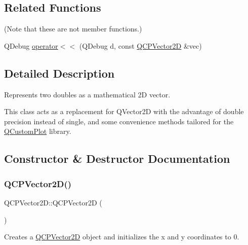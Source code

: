 \subsection*{Related Functions}
(Note that these are not member functions.) \begin{DoxyCompactItemize}
\item 
Q\+Debug \mbox{\hyperlink{class_q_c_p_vector2_d_a6c757af9671d925af4a36c2f58fb7234}{operator$<$$<$}} (Q\+Debug d, const \mbox{\hyperlink{class_q_c_p_vector2_d}{Q\+C\+P\+Vector2D}} \&vec)
\end{DoxyCompactItemize}


\subsection{Detailed Description}
Represents two doubles as a mathematical 2D vector. 

This class acts as a replacement for Q\+Vector2D with the advantage of double precision instead of single, and some convenience methods tailored for the \mbox{\hyperlink{class_q_custom_plot}{Q\+Custom\+Plot}} library. 

\subsection{Constructor \& Destructor Documentation}
\mbox{\label{class_q_c_p_vector2_d_a04c90748c3623044c79fa20788ffbcc6}} 
\subsubsection{\texorpdfstring{Q\+C\+P\+Vector2\+D()}{QCPVector2D()}\hspace{0.1cm}{\footnotesize\ttfamily [1/4]}}
{\footnotesize\ttfamily Q\+C\+P\+Vector2\+D\+::\+Q\+C\+P\+Vector2D (\begin{DoxyParamCaption}{ }\end{DoxyParamCaption})}

Creates a \mbox{\hyperlink{class_q_c_p_vector2_d}{Q\+C\+P\+Vector2D}} object and initializes the x and y coordinates to 0. \mbox{\label{class_q_c_p_vector2_d_a47bd86cebc5588dad6ec84349d9098d4}} 
